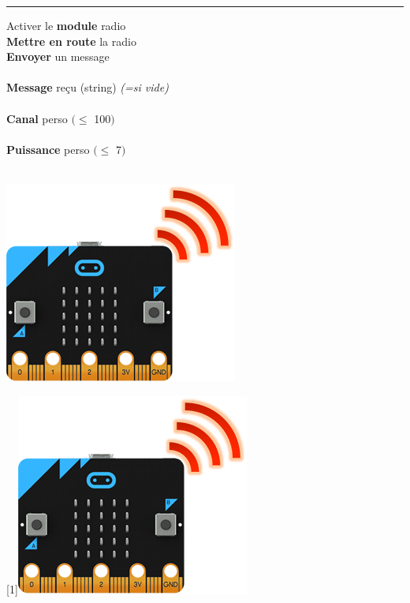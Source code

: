 \begin{minipage}{0.7\linewidth}
	\begin{methode}[Radio]
		\rule{-0.25em}{2em}
		Activer le \textbf{module} radio
		\hfill {}\\
		
		\textbf{Mettre en route} la radio
		\hfill {}\\
		
		\textbf{Envoyer} un message
		\hfill {}\\
		\hfill \ex {}\\
		
		\textbf{Message} reçu (string) 
		\textit{\footnotesize (=si vide)}
		\hfill {}\\
		\hfill \ex {}\\
		
		\textbf{Canal} perso $(\leq$ 100$\big )$
		\hfill {}\\	
		\hfill \ex {}\\
		
		\textbf{Puissance} perso $(\leq$ 7$\big )$
		\hfill {}\\
		\hfill \ex {}\\
	\end{methode}
\end{minipage}
\hfill
\begin{minipage}{0.3\linewidth}
	\begin{center}
		\includegraphics[width=0.7\linewidth]{res/ft_radio.png}\\
	\end{center}
	\hfill \scalebox{-1}[1]{\includegraphics[width=0.2\linewidth]{res/ft_radio.png}}
\end{minipage}




